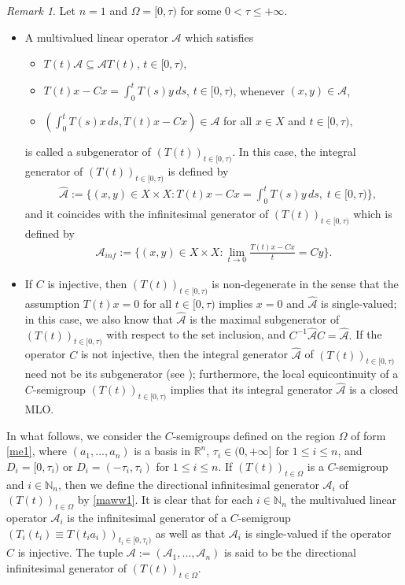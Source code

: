 \documentclass{amsart}
\theoremstyle{definition}
\theoremstyle{remark}
\newtheorem{rem}[thm]{Remark}
\numberwithin{equation}{section}
\begin{document}
\begin{rem}\label{konc}
Let $n=1$ and $\Omega=[0,\tau)$ for some $0<\tau \leq +\infty .$
\begin{itemize}
\item[(i)] A multivalued linear operator ${\mathcal A}$ which satisfies 
\begin{itemize}
\item[(a)] $T(t){\mathcal A}\subseteq {\mathcal A}T(t)$, $t\in[0,\tau)$,
\item[(b)] $T(t)x-Cx=\int_0^tT(s)y\,ds$, $t\in[0,\tau)$, whenever $(x,y)\in {\mathcal A}$, 
\item[(c)] $(\int_0^tT(s)x\,ds,T(t)x-Cx)\in {\mathcal A}$ for all $x\in X$ and $t\in [0,\tau),$
\end{itemize}
is called a subgenerator of $(T(t))_{t\in[0,\tau)}$. In this case, the integral generator of $(T(t))_{t\in[0,\tau)}$ is defined by
\begin{align*}
&\hat{{\mathcal A}}:=\biggl\{(x,y)\in X\times X: T(t)x-Cx=\int_0^tT(s)y\,ds,\;t\in[0,\tau)\biggr\},
\end{align*}
and it coincides with the infinitesimal generator of $(T(t))_{t\in[0,\tau)}$ which is defined by
\begin{align*}
{\mathcal A}_{inf} :=\Biggl\{ ( x,y) \in X \times X : \lim_{t\rightarrow 0}\frac{T(t)x-Cx}{t}=Cy\Biggr\}.
\end{align*} 
\item[(ii)] If $C$ is injective, then $(T(t))_{t\in[0,\tau)}$ is non-degenerate in the sense that the assumption $T(t)x=0$ for all $t\in [0,\tau)$ implies $x=0$ and $\hat{{\mathcal A}}$ is single-valued; in this case, we also know that $\hat{{\mathcal A}}$ is the maximal subgenerator of $(T(t))_{t\in[0,\tau)}$ with respect to the set inclusion, and $C^{-1}\hat{{\mathcal A}}C=\hat{{\mathcal A}}.$ If the operator $C$ is not injective, then the integral generator $\hat{{\mathcal A}}$  of $(T(t))_{t\in[0,\tau)}$ need not be its subgenerator (see \cite[Example 3.2.42]{FKP}); furthermore, the local equicontinuity of a $C$-semigroup $(T(t))_{t\in [0,\tau)} $ implies that its integral generator $\hat{{\mathcal A}}$ is a closed MLO.
\end{itemize} 
\end{rem}

In what follows, we consider the $C$-semigroups defined on the region $\Omega$ of form \eqref{me1},
where $(a_{1},...,a_{n})$ is a basis in ${\mathbb R}^{n}$, $\tau_{i}\in (0,+\infty]$ for $1\leq i \leq n$, and $D_{i}=[0,\tau_{i})$ or $D_{i}=(-\tau_{i},\tau_{i})$ for $1\leq i\leq n.$ If $(T(t))_{t\in \Omega}$ is a $C$-semigroup and $i\in {\mathbb N}_{n}$, then we define the directional infinitesimal generator ${\mathcal A}_{i}$ of $(T(t))_{t\in \Omega}$ by \eqref{maww1}.
It is clear that for each $i\in {\mathbb N}_{n}$ the multivalued linear operator ${\mathcal A}_{i}$ is the infinitesimal generator of a $C$-semigroup $(T_{i}(t_{i})\equiv T(t_{i}a_{i}))_{t_{i}\in [0,\tau_{i})} $ as well as that ${\mathcal A}_{i}$ is single-valued if the operator $C$ is injective. The tuple ${\mathcal A}:=({\mathcal A}_{1},...,{\mathcal A}_{n})$ is said to be the directional infinitesimal generator of $(T(t))_{t\in \Omega}$.
\end{document}

